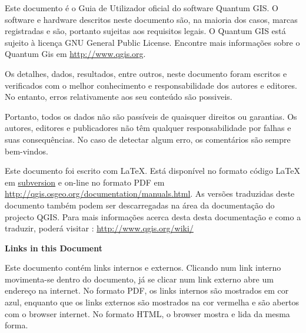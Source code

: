 \frontmatter
\pagestyle{scrplain}
\vspace{1cm}


Este documento é o Guia de Utilizador oficial do 
software Quantum GIS. O software e hardware descritos neste 
documento são, na maioria dos casos, marcas registradas e são, portanto sujeitas 
aos requisitos legais. O Quantum GIS está sujeito à licença GNU General Public 
License. Encontre mais informações sobre o Quantum Gis em 
\url{http://www.qgis.org}.
\par\bigskip
Os detalhes, dados, resultados, entre outros, neste documento foram 
escritos e verificados com o melhor conhecimento e responsabilidade dos  
autores e editores. No entanto, erros relativamente aos seu conteúdo são possiveis.
\par\bigskip
Portanto, todos os dados não são passíveis de quaisquer direitos ou garantias. Os autores, editores 
e publicadores não têm qualquer responsabilidade por falhas e 
suas consequências. No caso de detectar algum erro, os comentários são sempre bem-vindos.
\par\bigskip
Este documento foi escrito com \LaTeX. Está disponível no formato código \LaTeX 
em \href{http://wiki.qgis.org/qgiswiki/DocumentationWritersCorner}{subversion} 
e on-line no formato PDF em \url{http://qgis.osgeo.org/documentation/manuals.html}. 
As versões traduzidas deste documento também podem ser descarregadas na área da documentação 
do projecto QGIS. Para mais informações acerca desta 
desta documentação e como a traduzir, poderá visitar : \url{http://www.qgis.org/wiki/} 

\vspace{1cm}
\noindent
\textbf{Links in this Document}
\par\bigskip
Este documento contém links internos e externos. Clicando num 
link interno movimenta-se dentro do documento, já se clicar num link externo
abre um endereço na internet. No formato PDF, os links internos são mostrados em cor azul, 
enquanto que os links externos são mostrados na cor vermelha e são abertos com o 
browser internet. No formato HTML, o browser mostra e lida da
mesma forma. 

\newpage

